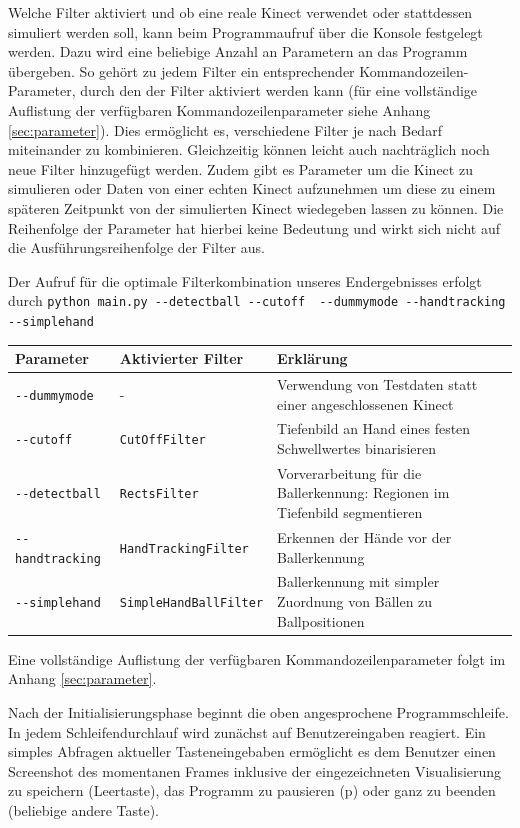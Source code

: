 \documentclass[12pt,a4paper,ngerman]{scrartcl}
\begin{document}
Welche Filter aktiviert und ob eine reale Kinect verwendet oder stattdessen simuliert werden soll, kann beim Programmaufruf über die Konsole festgelegt werden. Dazu wird eine beliebige Anzahl an Parametern an das Programm übergeben. So gehört zu jedem Filter ein entsprechender Kommandozeilen-Parameter, durch den der Filter aktiviert werden kann (für eine vollständige Auflistung der verfügbaren Kommandozeilenparameter  siehe Anhang \ref{sec:parameter}). Dies ermöglicht es, verschiedene Filter je nach Bedarf miteinander zu kombinieren. Gleichzeitig können leicht auch nachträglich noch neue Filter hinzugefügt werden. Zudem gibt es Parameter um die Kinect zu simulieren oder Daten von einer echten Kinect aufzunehmen um diese zu einem späteren Zeitpunkt von der simulierten Kinect wiedegeben lassen zu können. Die Reihenfolge der Parameter hat hierbei keine Bedeutung und wirkt sich nicht auf die Ausführungsreihenfolge der Filter aus.

Der Aufruf für die optimale Filterkombination unseres Endergebnisses erfolgt durch \lstinline{python main.py --detectball --cutoff  --dummymode --handtracking --simplehand}

\begin{tabular}{llp{8cm}}
Parameter & Aktivierter Filter & Erklärung \\ \hline
{\lstinline!--dummymode!} & - & Verwendung von Testdaten statt einer angeschlossenen Kinect \\
{\lstinline!--cutoff!} & {\lstinline!CutOffFilter!} & Tiefenbild an Hand eines festen Schwellwertes binarisieren \\
{\lstinline!--detectball!} & {\lstinline!RectsFilter!} & Vorverarbeitung für die Ballerkennung: Regionen im Tiefenbild segmentieren \\
{\lstinline!--handtracking!} & {\lstinline!HandTrackingFilter!} & Erkennen der Hände vor der Ballerkennung \\
{\lstinline!--simplehand!} & {\lstinline!SimpleHandBallFilter!} & Ballerkennung mit simpler Zuordnung von Bällen zu Ballpositionen
\end{tabular}

Eine vollständige Auflistung der verfügbaren Kommandozeilenparameter folgt im Anhang \ref{sec:parameter}.

Nach der Initialisierungsphase beginnt die oben angesprochene Programmschleife.
In jedem Schleifendurchlauf wird zunächst auf Benutzereingaben reagiert.
Ein simples Abfragen aktueller Tasteneingebaben ermöglicht es dem Benutzer einen Screenshot des momentanen Frames inklusive der eingezeichneten Visualisierung zu speichern (Leertaste), das Programm zu pausieren (p) oder ganz zu beenden (beliebige andere Taste).
\end{document}
